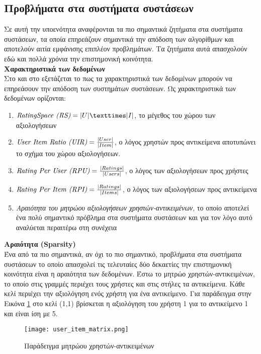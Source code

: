  \subsection{Προβλήματα στα συστήματα συστάσεων}
 \noindent Σε αυτή την υποενότητα αναφέρονται τα πιο σημαντικά ζητήματα στα συστήματα συστάσεων, τα οποία επηρεάζουν σημαντικά την απόδοση των αλγορίθμων και αποτελούν αιτία εμφάνισης επιπλέον προβλημάτων. Τα ζητήματα αυτά απασχολούν εδώ και πολλά χρόνια την επιστημονική κοινότητα. \\
 
\label{sec:rec_problems}
\noindent \textbf{Χαρακτηριστικά των δεδομένων}\\
Στο \cite{adomaviciusImpactDataCharacteristics2012} και στο \cite{deldjooExplainingRecommenderSystems2021} εξετάζεται το πως τα χαρακτηριστικά των δεδομένων μπορούν να επηρεάσουν την απόδοση των συστημάτων συστάσεων. Ως χαρακτηριστικά των δεδομένων ορίζονται:
\begin{enumerate}
	\item $ \text{\textit{RatingSpace (RS)}} =|U| × |I|  $, το μέγεθος του χώρου των αξιολογήσεων
	\item $ \text{\textit{User Item Ratio (UIR)}} =\frac{|User|}{|Item|} $, ο λόγος χρηστών προς αντικείμενα αποτυπώνει το σχήμα του χώρου αξιολογήσεων.
	\item $  \text{\textit{Rating Per User (RPU)}} = \frac{|Ratings|}{|Users|} $, ο λόγος των αξιολογήσεων προς χρήστες
	\item $ \text{\textit{Rating Per Item (RPI)}} = \frac{|Ratings|}{|Items|} $, ο λόγος των αξιολογήσεων προς αντικείμενα
	\item \textit{Αραιότητα του μητρώου αξιολογήσεων χρηστών-αντικειμένων}, το οποίο αποτελεί ένα πολύ σημαντικό πρόβλημα στα συστήματα συστάσεων και για τον λόγο αυτό αναλύεται περαιτέρω στη συνέχεια
\end{enumerate}
\noindent \textbf{Αραιότητα (Sparsity)}\\
Ένα από τα πιο σημαντικά, αν όχι το πιο σημαντικό, προβλήματα στα συστήματα συστάσεων το οποίο απασχολεί τις τελευταίες δύο δεκαετίες την επιστημονική κοινότητα είναι η αραιότητα των δεδομένων.
Έστω το μητρώο χρηστών-αντικειμένων, το οποίο στις γραμμές περιέχει τους χρήστες και στις στήλες τα αντικείμενα. Κάθε κελί περιέχει την αξιολόγηση ενός χρήστη για ένα αντικείμενο. Για παράδειγμα στην Εικόνα \ref{fig:uimatrix} στο κελί (1,1) βρίσκεται η αξιολόγηση του χρήστη 1 για το αντικείμενο 1 και είναι ίση με 5. 
\begin{figure}[!htb]
	\centering
	\texttt{[image: user\_item\_matrix.png]}
	\caption{Παράδειγμα μητρώου χρηστών-αντικειμένων}
	\label{fig:uimatrix}
\end{figure}

